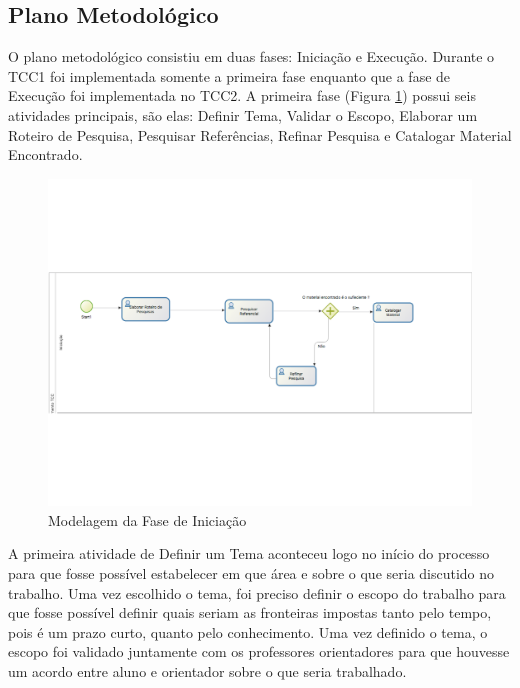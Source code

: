 \subsection{Plano Metodológico}
\label{plano_metodologico}
O plano metodológico consistiu em duas fases: Iniciação e Execução. Durante o TCC1 foi implementada somente a primeira fase enquanto que a fase de Execução foi implementada no TCC2. A primeira fase (Figura \ref{img:iniciacao}) possui seis atividades principais, são elas: Definir Tema, Validar o Escopo, Elaborar um Roteiro de Pesquisa, Pesquisar Referências, Refinar Pesquisa e Catalogar Material Encontrado.

\graphicspath{{figuras/}}
\begin{figure}
\centering
\includegraphics[scale=0.80]{iniciacao}
\caption{Modelagem da Fase de Iniciação}
\label{img:iniciacao}
\end{figure}


A primeira atividade de Definir um Tema aconteceu logo no início do processo para que fosse possível estabelecer em que área e sobre o que seria discutido no trabalho. Uma vez escolhido o tema, foi preciso definir o escopo do trabalho para que fosse possível definir quais seriam as fronteiras impostas tanto pelo tempo, pois é um prazo curto, quanto pelo conhecimento. Uma vez definido o tema, o escopo foi validado juntamente com os professores orientadores para que houvesse um acordo entre aluno e orientador sobre o que seria trabalhado.

